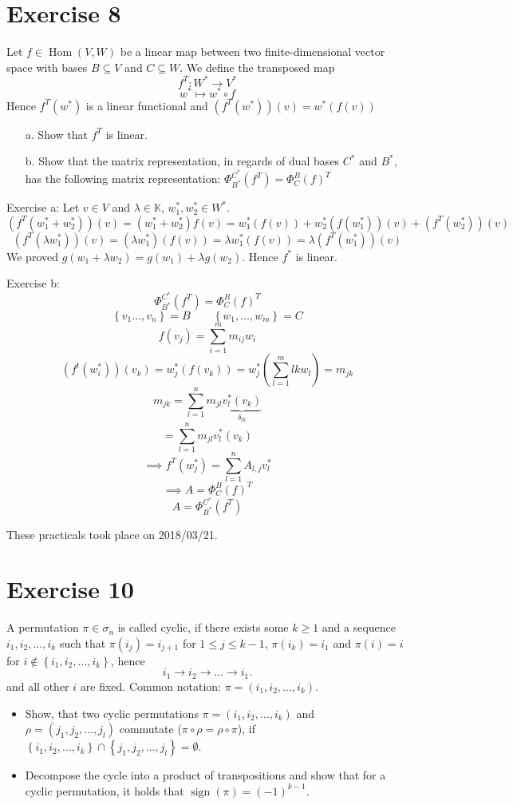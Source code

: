 \documentclass[a4paper]{article}
\theoremstyle{definition}
\DeclareMathOperator\sign{sign}
\newcommand\dateref[1]{These practicals took place on #1.\par}
\newcommand\set[1]{\left\{#1\right\}}
\begin{document}
\section*{Exercise 8}
\begin{ex}
  Let $f \in \operatorname{Hom}(V, W)$ be a linear map between two finite-dimensional vector space with bases $B \subseteq V$ and $C \subseteq W$. We define the transposed map
  \[ f^T: W^* \to V^* \]
  \[ w^* \mapsto w^* \circ f \]
  Hence $f^T(w^*)$ is a linear functional and $(f^T(w^*))(v) = w^*(f(v))$
  \begin{enumerate}
    \item[a.]
      Show that $f^T$ is linear.
    \item[b.]
      Show that the matrix representation, in regards of dual bases $C^*$ and $B^*$, has the following matrix representation: $\Phi_{B^*}^{C^*}(f^T) = \Phi_C^B(f)^T$
  \end{enumerate}
\end{ex}

Exercise a:
Let $v \in V$ and $\lambda \in \mathbb K$, $w_1^*, w_2^* \in W^*$.
\[ (f^T(w_1^* + w_2^*))(v) = (w_1^* + w_2^*)f(v) = w_1^*(f(v)) + w_2^*(f(w_1^*))(v) + (f^T(w_2^*))(v) \]
\[ (f^T(\lambda w_1^*))(v) = (\lambda w_1^*)(f(v)) = \lambda w_1^*(f(v)) = \lambda (f^T(w_1^*))(v) \]
We proved $g(w_1 + \lambda w_2) = g(w_1) + \lambda g(w_2)$. Hence $f^*$ is linear.

Exercise b:
\[ \Phi_{B^*}^{C^*}(f^T) = \Phi_C^B(f)^T \]
\[ \set{v_1 \dots, v_n} = B \qquad \set{w_1, \dots, w_m} = C \]
\[ f(v_j) = \sum_{i=1}^m m_{ij} w_i \]
\[ (f^t(w_i^*))(v_k) = w_j^*(f(v_k)) = w_j^* \left(\sum_{l=1}^m {lk} w_l\right) = m_{jk} \]
\[ m_{jk} = \sum_{l=1}^n m_{jl} \underbrace{v_{l}^*(v_k)}_{\delta_{lk}} \]
\[ = \sum_{l=1}^n m_{jl} v_l^*(v_k) \]
\[ \implies f^T(w_j^*) = \sum_{l=1}^n A_{l,j} v_l^* \]
\[ \implies A = \Phi_C^B(f)^T \]
\[ A = \Phi_{B^*}^{C^*}(f^T) \]

\dateref{2018/03/21}

\section*{Exercise 10}
\begin{ex}
  A permutation $\pi \in \sigma_n$ is called cyclic, if there exists some $k \geq 1$ and a sequence $i_1, i_2, \dots, i_k$ such that $\pi(i_j) = i_{j+1}$ for $1 \leq j \leq k-1$, $\pi(i_k) = i_1$ and $\pi(i) = i$ for $i \not\in \set{i_1, i_2, \dots, i_k}$, hence
  \[ i_1 \to i_2 \to \dots \to i_1. \]
  and all other $i$ are fixed. Common notation: $\pi = (i_1, i_2, \dots, i_k)$.
  \begin{itemize}
    \item Show, that two cyclic permutations $\pi = (i_1, i_2, \dots, i_k)$ and $\rho = (j_1, j_2, \dots, j_l)$ commutate ($\pi \circ \rho = \rho \circ \pi$), if $\set{i_1, i_2, \dots, i_k} \cap \set{j_1, j_2, \dots, j_l} = \emptyset$.
    \item Decompose the cycle into a product of transpositions and show that for a cyclic permutation, it holds that $\sign(\pi) = (-1)^{k-1}$.
  \end{itemize}
\end{ex}
\end{document}
